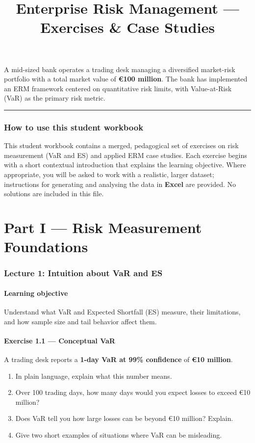 \documentclass[11pt]{article}
\title{\textbf{Enterprise Risk Management --- Exercises \& Case Studies}}
\author{}
\date{}
\begin{document}
\maketitle

A mid-sized bank operates a trading desk managing a diversified market-risk portfolio with a total market value of \textbf{€100 million}. The bank has implemented an ERM framework centered on quantitative risk limits, with Value-at-Risk (VaR) as the primary risk metric.

\bigskip
\hrule
\bigskip

\section*{How to use this student workbook}
This student workbook contains a merged, pedagogical set of exercises on risk measurement (VaR and ES) and applied ERM case studies. Each exercise begins with a short contextual introduction that explains the learning objective. Where appropriate, you will be asked to work with a realistic, larger dataset; instructions for generating and analysing the data in \textbf{Excel} are provided. No solutions are included in this file.

\newpage
\part*{Part I --- Risk Measurement Foundations}

\section{Lecture 1: Intuition about VaR and ES}
\subsection*{Learning objective}
Understand what VaR and Expected Shortfall (ES) measure, their limitations, and how sample size and tail behavior affect them.

\subsection*{Exercise 1.1 --- Conceptual VaR}
A trading desk reports a \textbf{1-day VaR at 99\% confidence} of \textbf{€10 million}.

\begin{enumerate}
  \item In plain language, explain what this number means.
  \item Over 100 trading days, how many days would you expect losses to exceed €10 million?
  \item Does VaR tell you how large losses can be beyond €10 million? Explain.
  \item Give two short examples of situations where VaR can be misleading.
\end{enumerate}
\end{document}
